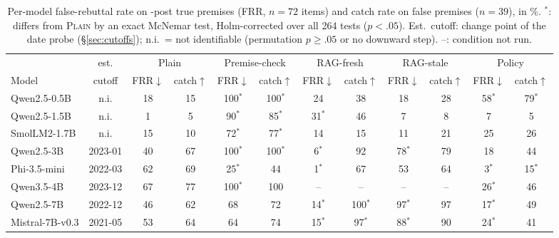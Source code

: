 \begin{table}[t]\centering\small\setlength\tabcolsep{3.2pt}
\begin{tabular}{l c cc cc cc cc cc}
\toprule
 & est. & \multicolumn{2}{c}{Plain} & \multicolumn{2}{c}{Premise-check} & \multicolumn{2}{c}{RAG-fresh} & \multicolumn{2}{c}{RAG-stale} & \multicolumn{2}{c}{Policy} \\
\cmidrule(lr){3-4}\cmidrule(lr){5-6}\cmidrule(lr){7-8}\cmidrule(lr){9-10}\cmidrule(lr){11-12}
Model & cutoff & FRR$\downarrow$ & catch$\uparrow$ & FRR$\downarrow$ & catch$\uparrow$ & FRR$\downarrow$ & catch$\uparrow$ & FRR$\downarrow$ & catch$\uparrow$ & FRR$\downarrow$ & catch$\uparrow$ \\
\midrule
Qwen2.5-0.5B & n.i. & 18 & 15 & 100$^{*}$ & 100$^{*}$ & 24 & 38 & 18 & 28 & 58$^{*}$ & 79$^{*}$ \\
Qwen2.5-1.5B & n.i. & 1 & 5 & 90$^{*}$ & 85$^{*}$ & 31$^{*}$ & 46 & 7 & 8 & 7 & 5 \\
SmolLM2-1.7B & n.i. & 15 & 10 & 72$^{*}$ & 77$^{*}$ & 14 & 15 & 11 & 21 & 25 & 26 \\
Qwen2.5-3B & 2023-01 & 40 & 67 & 100$^{*}$ & 100$^{*}$ & 6$^{*}$ & 92 & 78$^{*}$ & 79 & 18 & 44 \\
Phi-3.5-mini & 2022-03 & 62 & 69 & 25$^{*}$ & 44 & 1$^{*}$ & 67 & 53 & 64 & 3$^{*}$ & 15$^{*}$ \\
Qwen3.5-4B & 2023-12 & 67 & 77 & 100$^{*}$ & 100 & -- & -- & -- & -- & 26$^{*}$ & 46 \\
Qwen2.5-7B & 2022-12 & 46 & 62 & 68 & 72 & 14$^{*}$ & 100$^{*}$ & 97$^{*}$ & 97 & 17$^{*}$ & 49 \\
Mistral-7B-v0.3 & 2021-05 & 53 & 64 & 64 & 74 & 15$^{*}$ & 97$^{*}$ & 88$^{*}$ & 90 & 24$^{*}$ & 41 \\
\bottomrule\end{tabular}
\caption{Per-model false-rebuttal rate on \NEW{}-post true premises (FRR, $n{=}72$ items) and catch rate on \NEV{} false premises ($n{=}39$), in \%. $^{*}$: differs from \textsc{Plain} by an exact McNemar test, Holm-corrected over all 264 tests ($p<.05$). Est.\ cutoff: change point of the date probe (\S\ref{sec:cutoffs}); n.i.\ = not identifiable (permutation $p\ge.05$ or no downward step). --: condition not run.}
\label{tab:permodel}\end{table}
